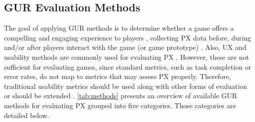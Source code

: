 \subsection{\ac{GUR} Evaluation Methods}
\label{subsec:methods}
The goal of applying \ac{GUR} methods is to determine whether a game offers a compelling and engaging experience to players \autocite{Yanez-Gomez2017,Bernhaupt2015}, collecting \ac{PX} data before, during and/or after players interact with the game (or game prototype) \autocite{Wiemeyer2016,Nacke2015,Mueller2015,Drachen2013}. Also, \ac{UX} and usability methods are commonly used for evaluating \ac{PX} \autocite{Yanez-Gomez2017,McAllister2015}. However, these are not sufficient for evaluating games, since standard metrics, such as task completion or error rates, do not map to metrics that may assess \ac{PX} properly. Therefore, traditional usability metrics should be used along with other forms of evaluation or should be extended \autocite{Wiemeyer2016,McAllister2015,Bernhaupt2015,Nackea,Hoysniemi2006}. \autoref{tab:methods} presents an overview of available \ac{GUR} methods for evaluating \ac{PX} grouped into five categories. Those categories are detailed below.

